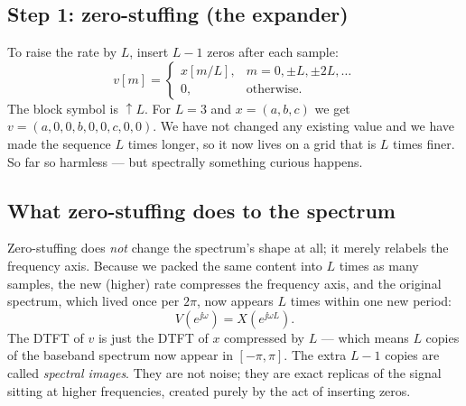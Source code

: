 \subsection{Step 1: zero-stuffing (the expander)}

To raise the rate by $L$, insert $L-1$ zeros after each sample:
\begin{equation}
  v[m] =
  \begin{cases}
    x[m/L], & m = 0, \pm L, \pm 2L, \dots\\
    0, & \text{otherwise.}
  \end{cases}
  \label{ch22:expand}
\end{equation}
The block symbol is $\uparrow L$. For $L=3$ and $x = (a, b, c)$ we get
$v = (a, 0, 0, b, 0, 0, c, 0, 0)$. We have not changed any existing value and we
have made the sequence $L$ times longer, so it now lives on a grid that is $L$
times finer. So far so harmless --- but spectrally something curious happens.

\subsection{What zero-stuffing does to the spectrum}

Zero-stuffing does \emph{not} change the spectrum's shape at all; it merely
relabels the frequency axis. Because we packed the same content into $L$ times as
many samples, the new (higher) rate compresses the frequency axis, and the
original spectrum, which lived once per $2\pi$, now appears $L$ times within one
new period:
\begin{equation}
  V(e^{\jj\omega}) = X(e^{\jj\omega L}).
  \label{ch22:expandspec}
\end{equation}
The DTFT of $v$ is just the DTFT of $x$ compressed by $L$ --- which means $L$
copies of the baseband spectrum now appear in $[-\pi, \pi]$. The extra $L-1$
copies are called \emph{spectral images}. They are not noise; they are exact
replicas of the signal sitting at higher frequencies, created purely by the act
of inserting zeros.

